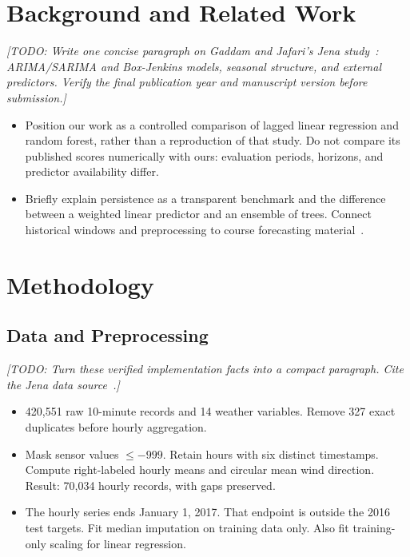 \documentclass[11pt]{article}
\newcommand{\todo}[1]{\par\smallskip\noindent
  {\color{blue!60!black}\textit{[TODO: #1]}}\par\smallskip}
\begin{document}
\section{Background and Related Work}
\label{sec:background}
\todo{Write one concise paragraph on
Gaddam and Jafari's Jena study~\cite{gaddam}: ARIMA/SARIMA and Box-Jenkins
models, seasonal structure, and external predictors. Verify the final
publication year and manuscript version before submission.}
\begin{itemize}
  \item Position our work as a controlled comparison of lagged linear
  regression and random forest, rather than a reproduction of that study.
  Do not compare its published scores numerically with ours: evaluation
  periods, horizons, and predictor availability differ.
  \item Briefly explain persistence as a transparent benchmark and the
  difference between a weighted linear predictor and an ensemble of trees.
  Connect historical windows and preprocessing to course
  forecasting material~\cite{course}.
\end{itemize}

\section{Methodology}
\label{sec:methods}
\subsection{Data and Preprocessing}
\todo{Turn these verified implementation facts into a compact paragraph.
Cite the Jena data source~\cite{jena}.}
\begin{itemize}
  \item 420,551 raw 10-minute records and 14 weather variables. Remove
  327 exact duplicates before hourly aggregation.
  \item Mask sensor values $\leq -999$. Retain hours with six distinct
  timestamps. Compute right-labeled hourly means and circular mean wind
  direction. Result: 70,034 hourly records, with gaps preserved.
  \item The hourly series ends January 1, 2017. That endpoint is outside
  the 2016 test targets. Fit median imputation on training data only.
  Also fit training-only scaling for linear regression.
\end{itemize}
\end{document}
